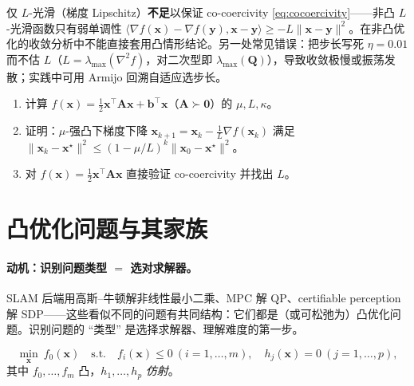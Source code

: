 \begin{pitfall}
仅 $L$-光滑（梯度 Lipschitz）\textbf{不足}以保证 co-coercivity \cref{eq:cocoercivity}——非凸 $L$-光滑函数只有弱单调性 $\langle\nabla f(\mathbf x)-\nabla f(\mathbf y),\mathbf x-\mathbf y\rangle\ge-L\|\mathbf x-\mathbf y\|^2$。在非凸优化的收敛分析中不能直接套用凸情形结论。另一处常见错误：把步长写死 $\eta=0.01$ 而不估 $L$（$L=\lambda_{\max}(\nabla^2 f)$，对二次型即 $\lambda_{\max}(\mathbf Q)$），导致收敛极慢或振荡发散；实践中可用 Armijo 回溯自适应选步长。
\end{pitfall}

\begin{practice}
\begin{enumerate}
  \item 计算 $f(\mathbf x)=\tfrac12\mathbf x^\top\mathbf A\mathbf x+\mathbf b^\top\mathbf x$（$\mathbf A\succ\mathbf 0$）的 $\mu,L,\kappa$。
  \item 证明：$\mu$-强凸下梯度下降 $\mathbf x_{k+1}=\mathbf x_k-\tfrac1L\nabla f(\mathbf x_k)$ 满足 $\|\mathbf x_k-\mathbf x^\star\|^2\le(1-\mu/L)^k\|\mathbf x_0-\mathbf x^\star\|^2$。
  \item 对 $f(\mathbf x)=\tfrac12\mathbf x^\top\mathbf A\mathbf x$ 直接验证 co-coercivity 并找出 $L$。
\end{enumerate}
\end{practice}

\section{凸优化问题与其家族}
\label{sec:cvx-problem}

\paragraph{动机：识别问题类型 $=$ 选对求解器。}
SLAM 后端用高斯--牛顿解非线性最小二乘、MPC 解 QP、certifiable perception 解 SDP——这些看似不同的问题有共同结构：它们都是（或可松弛为）凸优化问题。识别问题的 “类型” 是选择求解器、理解难度的第一步。

\begin{definition}[凸优化问题标准形式]\label{def:cvx-problem}
\begin{equation}
  \min_{\mathbf x}\ f_0(\mathbf x)\quad\text{s.t.}\quad f_i(\mathbf x)\le0\ (i=1,\dots,m),\quad h_j(\mathbf x)=0\ (j=1,\dots,p),
  \label{eq:cvx-standard}
\end{equation}
其中 $f_0,\dots,f_m$ 凸，$h_1,\dots,h_p$ \emph{仿射}。
\end{definition}

